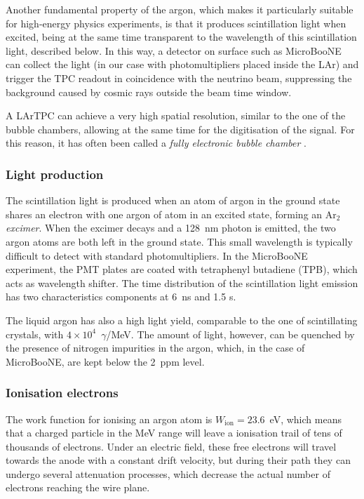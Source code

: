 Another fundamental property of the argon, which makes it particularly suitable for high-energy physics experiments, is that it produces scintillation light when excited, being at the same time transparent to the wavelength of this scintillation light, described below. In this way, a detector on surface such as MicroBooNE can collect the light (in our case with photomultipliers placed inside the LAr) and trigger the TPC readout in coincidence with the neutrino beam, suppressing the background caused by cosmic rays outside the beam time window. 

A LArTPC can achieve a very high spatial resolution, similar to the one of the bubble chambers, allowing at the same time for the digitisation of the signal. For this reason, it has often been called a \emph{fully electronic bubble chamber} \cite{Rubbia:2011zza}. 

\subsubsection{Light production}
The scintillation light is produced when an atom of argon in the ground state shares an electron with one argon of atom in an excited state, forming an Ar$_{2}$ \emph{excimer}. When the excimer decays and a 128~nm photon is emitted, the two argon atoms are both left in the ground state. This small wavelength is typically difficult to detect with standard photomultipliers. In the MicroBooNE experiment, the PMT plates are coated with tetraphenyl butadiene (TPB), which acts as wavelength shifter. The time distribution of the scintillation light emission has two characteristics components at 6~ns and 1.5 \si{\micro}s.

The liquid argon has also a high light yield, comparable to the one of scintillating crystals, with $4\times10^4$~$\gamma$/MeV. The amount of light, however, can be quenched by the presence of nitrogen impurities in the argon, which, in the case of MicroBooNE, are kept below the 2~ppm level.

\subsubsection{Ionisation electrons}\label{sec:ionisation}
The work function for ionising an argon atom is $W_{\mathrm{ion}} = 23.6$~eV, which means that a charged particle in the MeV range will leave a ionisation trail of tens of thousands of electrons. Under an electric field, these free electrons will travel towards the anode with a constant drift velocity, but during their path they can undergo several attenuation processes, which decrease the actual number of electrons reaching the wire plane. 

